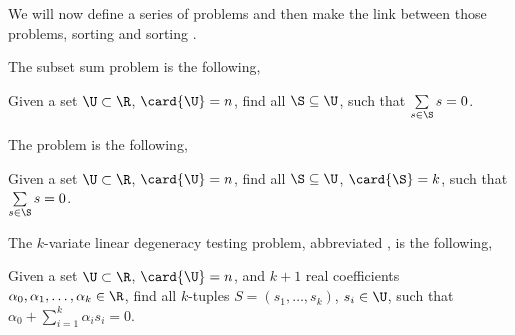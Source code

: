 We will now define a series of problems and then make the link between those
problems, sorting and sorting \XY.

The subset sum problem is the following,

\begin{problem}
Given a set $\U \subset \R$, $\card{\U} = n$, find all
$\S \subseteq \U$, such that $\sum\limits_{s \in \S} s = 0$.
\end{problem}


The \kSUM problem is the following,

\begin{problem}
Given a set $\U \subset \R$, $\card{\U} = n$, find all
$\S \subseteq \U$, $\card{\S} = k$, such that $\sum\limits_{s
\in \S} s = 0$.
\end{problem}


The $k$-variate linear degeneracy testing problem, abbreviated \kLDT, is the
following,

\begin{problem}
Given a set $\U \subset \R$, $\card{\U} = n$, and $k+1$ real
coefficients $\alpha_0, \alpha_1, \ldots, \alpha_k \in \R$, find all $k$-tuples
$S = (s_1, \ldots, s_k)$, $s_i \in \U$, such that
$\alpha_0 + \sum_{i=1}^{k} \alpha_i s_i = 0$.
\end{problem}
